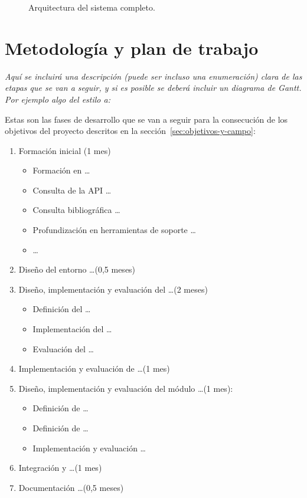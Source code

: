 \documentclass{article}
\begin{document}
\begin{figure}[tphb]
  \centering
  \caption{Arquitectura del sistema completo.}
  \label{fig_arquitectura}
\end{figure}


\section{Metodología y plan de trabajo}
\label{sec:metodologia-y-plan}

\textit{Aquí se incluirá una descripción (puede ser incluso una enumeración)
  clara de las etapas que se van a seguir, y si es posible se deberá
  incluir un diagrama de Gantt. Por ejemplo algo del estilo a:}

Estas son las fases de desarrollo que se van a seguir para la
consecución de los objetivos del proyecto descritos en la sección~\ref{sec:objetivos-y-campo}:

\begin{enumerate}
  
\item Formación inicial (1 mes)
  
  \begin{itemize}
  \item Formación en \ldots
  \item Consulta de la API \ldots
  \item Consulta bibliográfica \ldots
  \item Profundización en herramientas de soporte \ldots
  \item  \ldots
  \end{itemize}

\item Diseño del entorno \ldots (0,5 meses)

\item Diseño, implementación y evaluación del  \ldots (2 meses)
  \begin{itemize}
  \item Definición del  \ldots
  \item Implementación del  \ldots
  \item Evaluación del  \ldots
  \end{itemize}
  
\item Implementación y evaluación de  \ldots (1 mes)

\item Diseño, implementación y evaluación del módulo  \ldots (1 mes):
  \begin{itemize}
  \item Definición de  \ldots
  \item Definición de  \ldots
  \item Implementación y evaluación  \ldots
  \end{itemize}

\item Integración y  \ldots (1 mes)

\item Documentación  \ldots (0,5 meses)

\end{enumerate}
\end{document}
